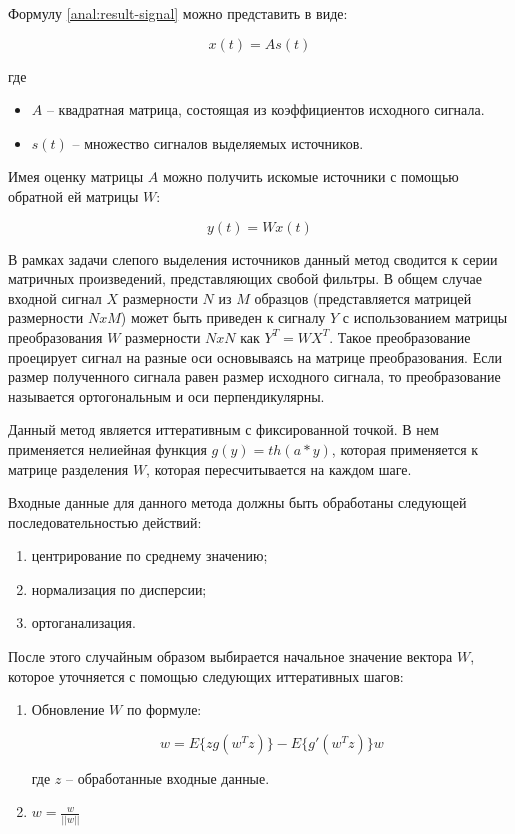 Формулу \ref{anal:result-signal} можно представить в виде:

\begin{equation}
x(t) = As(t)
\end{equation}

где

\begin{itemize}
	\item $A$ -- квадратная матрица, состоящая из коэффициентов исходного сигнала.
	\item $s(t)$ -- множество сигналов выделяемых источников.
\end{itemize}

Имея оценку матрицы $A$ можно получить искомые источники с помощью обратной ей матрицы $W$:

\begin{equation}
y(t) = Wx(t)
\end{equation}

В рамках задачи слепого выделения источников данный метод сводится к серии матричных произведений, представляющих свобой фильтры. В общем случае входной сигнал $X$ размерности $N$ из $M$ образцов (представляется матрицей размерности $NxM$) может быть приведен к сигналу $Y$ с использованием матрицы преобразования $W$ размерности $NxN$ как $Y^T = WX^T$. Такое преобразование проецирует сигнал на разные оси основываясь на матрице преобразования. Если размер полученного сигнала равен размер исходного сигнала, то преобразование называется ортогональным и оси перпендикулярны.

Данный метод является иттеративным с фиксированной точкой. В нем применяется нелиейная функция $g(y) = th(a * y)$, которая применяется к матрице разделения $W$, которая пересчитывается на каждом шаге.

Входные данные для данного метода должны быть обработаны следующей последовательностью действий:

\begin{enumerate}
	\item центрирование по среднему значению;
	\item нормализация по дисперсии;
	\item ортоганализация.
\end{enumerate}

После этого случайным образом выбирается начальное значение вектора $W$, которое уточняется с помощью следующих иттеративных шагов:

\begin{enumerate}
	\item Обновление $W$ по формуле:
	
	\begin{equation}
		w = E\{zg(w^Tz)\} - E\{g'(w^Tz)\}w
	\end{equation}
	
	где $z$ -- обработанные входные данные.
	\item $w = \frac{w}{|| w ||}$
\end{enumerate}

